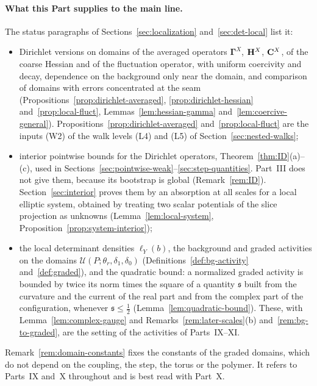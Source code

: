 \paragraph{What this Part supplies to the main line.} The status paragraphs of Sections~\ref{sec:localization} and~\ref{sec:det-local} list it:
\begin{itemize}
\item Dirichlet versions on domains of the averaged operators $\boldsymbol\Gamma^X$, $\mathbf H^X$, $\mathbf C^X$, of the coarse Hessian and of the fluctuation operator, with uniform coercivity and decay, dependence on the background only near the domain, and comparison of domains with errors concentrated at the seam (Propositions~\ref{prop:dirichlet-averaged}, \ref{prop:dirichlet-hessian} and~\ref{prop:local-fluct}, Lemmas~\ref{lem:hessian-gamma} and~\ref{lem:coercive-general}). Propositions~\ref{prop:dirichlet-averaged} and~\ref{prop:local-fluct} are the inputs (W2) of the walk levels (L4) and (L5) of Section~\ref{sec:nested-walks};
\item interior pointwise bounds for the Dirichlet operators, Theorem~\ref{thm:ID}(a)--(c), used in Sections~\ref{sec:pointwise-weak}--\ref{sec:step-quantities}. Part~III does not give them, because its bootstrap is global (Remark~\ref{rem:ID}). Section~\ref{sec:interior} proves them by an absorption at all scales for a local elliptic system, obtained by treating two scalar potentials of the slice projection as unknowns (Lemma~\ref{lem:local-system}, Proposition~\ref{prop:system-interior});
\item the local determinant densities $\ell_Y(b)$, the background and graded activities on the domains $\mathcal U(P;\theta_r,\delta_1,\delta_0)$ (Definitions~\ref{def:bg-activity} and~\ref{def:graded}), and the quadratic bound: a normalized graded activity is bounded by twice its norm times the square of a quantity $\mathfrak s$ built from the curvature and the current of the real part and from the complex part of the configuration, whenever $\mathfrak s\le\frac12$ (Lemma~\ref{lem:quadratic-bound}). These, with Lemma~\ref{lem:complex-gauge} and Remarks~\ref{rem:later-scales}(b) and~\ref{rem:bg-to-graded}, are the setting of the activities of Parts~IX--XI.
\end{itemize}
Remark~\ref{rem:domain-constants} fixes the constants of the graded domains, which do not depend on the coupling, the step, the torus or the polymer. It refers to Parts~IX and~X throughout and is best read with Part~X.

